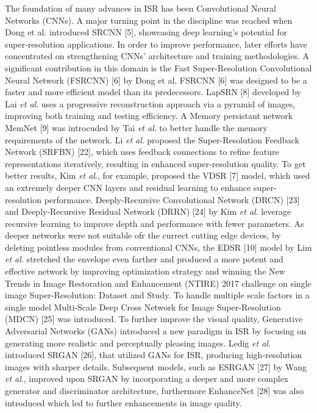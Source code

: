 \documentclass{ieeeaccess}
\begin{document}
The foundation of many advances in ISR has been Convolutional Neural Networks (CNNs). A major turning point in the discipline was reached when Dong et al. introduced SRCNN [5], showcasing deep learning's potential for super-resolution applications. In order to improve performance, later efforts have concentrated on strengthening CNNs' architecture and training methodologies. A significant contribution in this domain is the Fast Super-Resolution Convolutional Neural Network (FSRCNN) [6] by Dong et al. FSRCNN [6] was designed to be a faster and more efficient model than its predecessors. LapSRN [8] developed by Lai \textit{et al}. uses a progressive reconstruction approach via a pyramid of images, improving both training and testing efficiency. A Memory persistant network MemNet [9] was introcuded by Tai \textit{et al}. to better handle the memory requirements of the network. Li \textit{et al}. proposed the Super-Resolution Feedback Network (SRFBN) [22], which uses feedback connections to refine feature representations iteratively, resulting in enhanced super-resolution quality. To get better results, Kim \textit{et al}., for example, proposed the VDSR [7] model, which used an extremely deeper CNN layers and residual learning to enhance super-resolution performance. Deeply-Recursive Convolutional Network (DRCN) [23] and Deeply-Recursive Residual Network (DRRN) [24] by Kim \textit{et al}. leverage recursive learning to improve depth and performance with fewer parameters. As deeper networks were not suitable ofr the currect cutting edge devices, by deleting pointless modules from conventional CNNs, the EDSR [10] model by Lim \textit{et al}. stretched the envelope even farther and produced a more potent and effective network by improving optimization strategy and winning the New Trends in Image Restoration and Enhancement (NTIRE) 2017 challenge on single image Super-Resolution: Dataset and Study. To handle multiple scale factors in a single model Multi-Scale Deep Cross Network for Image Super-Resolution (MDCN) [25] was introduced. 
To further improve the visual quality, Generative Adversarial Networks (GANs) introduced a new paradigm in ISR by focusing on generating more realistic and perceptually pleasing images. Ledig \textit{et al}. introduced SRGAN [26], that utilized GANs for ISR, producing high-resolution images with sharper details. Subsequent models, such as ESRGAN [27] by Wang \textit{et al}., improved upon SRGAN by incorporating a deeper and more complex generator and discriminator architecture, furthermore EnhanceNet [28] was also introduced which led to further enhancements in image quality.
\end{document}
